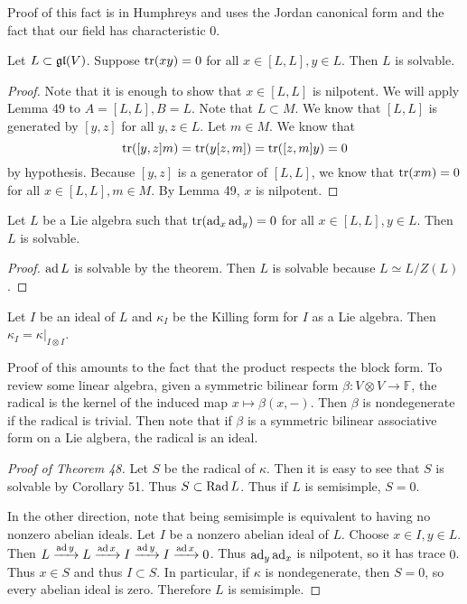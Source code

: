 \documentclass[twoside, 10pt]{article}
\newcommand{\F}{\mathbb{F}}
\begin{document}
    Proof of this fact is in Humphreys and uses the Jordan canonical form and the fact that our field has characteristic $0$.
    
    \begin{thm}
        Let $L \subset \mathfrak{gl}(V)$. Suppose $\operatorname{tr}(xy) = 0$ for all $x \in [L,L], y \in L$. Then $L$ is solvable.
    \end{thm}

    \begin{proof}
        Note that it is enough to show that $x \in [L,L]$ is nilpotent. We will apply Lemma 49 to $A = [L,L], B = L$. Note that $L \subset M$. We know that $[L,L]$ is generated by $[y,z]$ for all $y,z \in L$. Let $m \in M$. We know that
        \[ \operatorname{tr}([y,z]m) = \operatorname{tr}(y[z,m]) = \operatorname{tr}([z,m]y) = 0\] by hypothesis. Because $[y,z]$ is a generator of $[L,L]$, we know that $\operatorname{tr}(xm) = 0$ for all $x \in [L,L], m \in M$. By Lemma 49, $x$ is nilpotent.
    \end{proof}

    \begin{cor}
        Let $L$ be a Lie algebra such that $\operatorname{tr}(\operatorname{ad}_x \operatorname{ad}_y) = 0$ for all $x \in [L,L], y \in L$. Then $L$ is solvable.
    \end{cor}

    \begin{proof}
        $\operatorname{ad} L$ is solvable by the theorem. Then $L$ is solvable because $L \simeq L/Z(L)$.
    \end{proof}
    
    \begin{lem}
        Let $I$ be an ideal of $L$ and $\kappa_I$ be the Killing form for $I$ as a Lie algebra. Then $\kappa_I = \kappa|_{I \otimes I}$.
    \end{lem}

    Proof of this amounts to the fact that the product respects the block form. To review some linear algebra, given a symmetric bilinear form $\beta:V \otimes V \to \F$, the radical is the kernel of the induced map $x \mapsto \beta(x,-)$. Then $\beta$ is nondegenerate if the radical is trivial. Then note that if $\beta$ is a symmetric bilinear associative form on a Lie algbera, the radical is an ideal.

    \begin{proof}[Proof of Theorem 48]
        Let $S$ be the radical of $\kappa$. Then it is easy to see that $S$ is solvable by Corollary 51. Thus $S \subset \operatorname{Rad} L$. Thus if $L$ is semisimple, $S = 0$.

        In the other direction, note that being semisimple is equivalent to having no nonzero abelian ideals. Let $I$ be a nonzero abelian ideal of $L$. Choose $x \in I, y \in L$. Then $L \xrightarrow{\operatorname{ad} y} L \xrightarrow{\operatorname{ad} x} I \xrightarrow{\operatorname{ad} y} I \xrightarrow{\operatorname{ad} x} 0$. Thus $\operatorname{ad}_y \operatorname{ad}_x$ is nilpotent, so it has trace $0$. Thus $x \in S$ and thus $I \subset S$. In particular, if $\kappa$ is nondegenerate, then $S = 0$, so every abelian ideal is zero. Therefore $L$ is semisimple.
    \end{proof}
\end{document}
